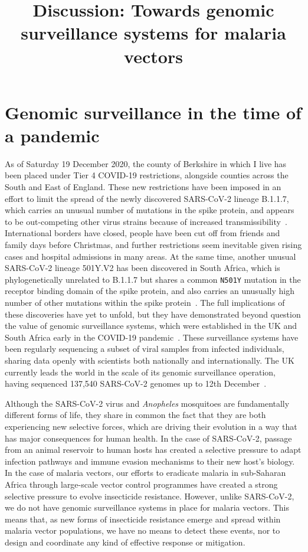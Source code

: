 \documentclass[a4paper,11pt,abstracton,hidelinks]{scrartcl}
\title{
Discussion: Towards genomic surveillance systems for malaria vectors
}
\author{}
\begin{document}
\renewcommand{\abstractname}{Summary}


\maketitle


\section{Genomic surveillance in the time of a pandemic}\label{sec:pandemic}


As of Saturday 19 December 2020, the county of Berkshire in which I live has been placed under Tier 4 COVID-19 restrictions, alongside counties across the South and East of England.
%
These new restrictions have been imposed in an effort to limit the spread of the newly discovered SARS-CoV-2 lineage B.1.1.7, which carries an unusual number of mutations in the spike protein, and appears to be out-competing other virus strains because of increased transmissibility~\parencite{Rambaut2020,Davies2020}.
%
International borders have closed, people have been cut off from friends and family days before Christmas, and further restrictions seem inevitable given rising cases and hospital admissions in many areas.
%
At the same time, another unusual SARS-CoV-2 lineage 501Y.V2 has been discovered in South Africa, which is phylogenetically unrelated to B.1.1.7 but shares a common \texttt{N501Y} mutation in the receptor binding domain of the spike protein, and also carries an unusually high number of other mutations within the spike protein~\parencite{Tegally2020}.
%
The full implications of these discoveries have yet to unfold, but they have demonstrated beyond question the value of genomic surveillance systems, which were established in the UK and South Africa early in the COVID-19 pandemic~\parencite{COGUK2020a,Msomi2020}.
%
These surveillance systems have been regularly sequencing a subset of viral samples from infected individuals, sharing data openly with scientists both nationally and internationally.
%
The UK currently leads the world in the scale of its genomic surveillance operation, having sequenced 137,540 SARS-CoV-2 genomes up to 12th December~\parencite{COGUK2020b}.


Although the SARS-CoV-2 virus and \textit{Anopheles} mosquitoes are fundamentally different forms of life, they share in common the fact that they are both experiencing new selective forces, which are driving their evolution in a way that has major consequences for human health.
%
In the case of SARS-CoV-2, passage from an animal reservoir to human hosts has created a selective pressure to adapt infection pathways and immune evasion mechanisms to their new host's biology.
%
In the case of malaria vectors, our efforts to eradicate malaria in sub-Saharan Africa through large-scale vector control programmes have created a strong selective pressure to evolve insecticide resistance.
%
However, unlike SARS-CoV-2, we do not have genomic surveillance systems in place for malaria vectors.
%
This means that, as new forms of insecticide resistance emerge and spread within malaria vector populations, we have no means to detect these events, nor to design and coordinate any kind of effective response or mitigation.
\end{document}
